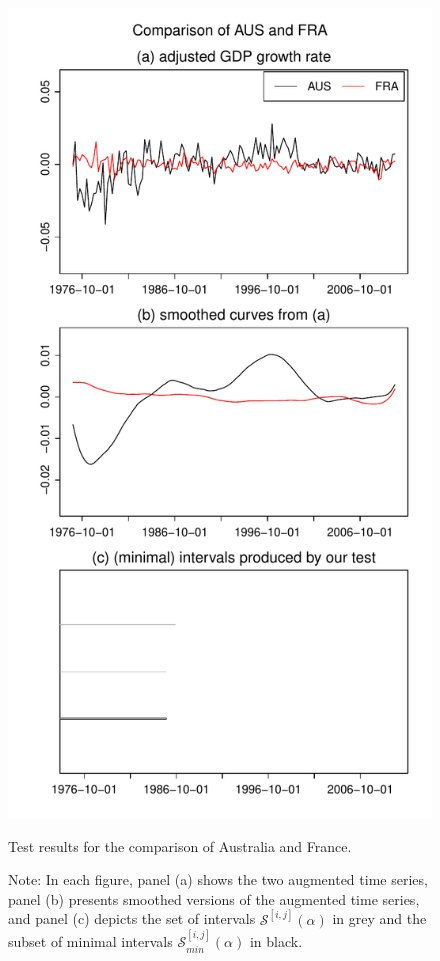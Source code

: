 \documentclass[a4paper,12pt]{article}
\begin{document}
\begin{figure}
\begin{minipage}[t]{0.24\textwidth}
\includegraphics[width=\textwidth]{output/plots/gdp/AUS_vs_FRA}
\caption{Test results for the comparison of Australia and France.}\label{fig:Australia:France}
\end{minipage}
\caption*{Note: In each figure, panel (a) shows the two augmented time series, panel (b) presents smoothed versions of the augmented time series, and panel (c) depicts the set of intervals $\mathcal{S}^{[i, j]}(\alpha)$ in grey and the subset of minimal intervals $\mathcal{S}^{[i, j]}_{min}(\alpha)$ in black.}
\end{figure}
\end{document}
